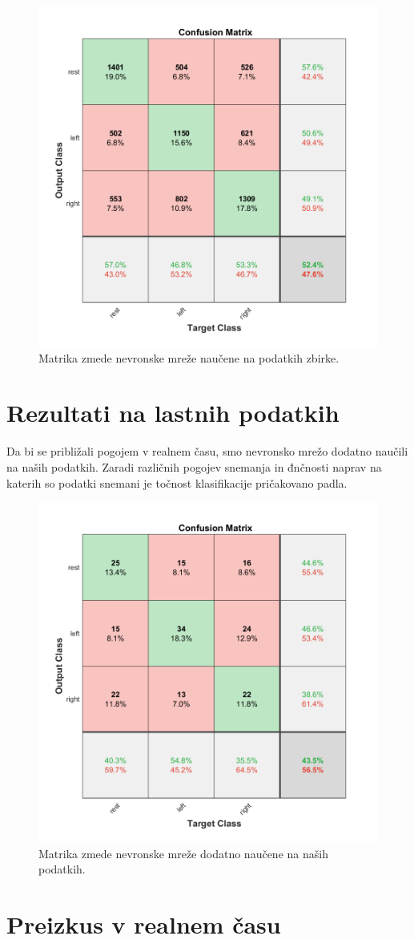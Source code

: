 \begin{figure}[h!]
\begin{center}
\includegraphics[width=0.5\linewidth]{slike/Confusion_13-20Hz_0s-4s.png}
\end{center}
\caption{Matrika zmede nevronske mreže naučene na podatkih zbirke.}
\end{figure}



\section{Rezultati na lastnih podatkih}
Da bi se približali pogojem v realnem času, smo nevronsko mrežo dodatno naučili na naših podatkih. Zaradi različnih pogojev snemanja in đnčnosti naprav na katerih so podatki snemani je točnost klasifikacije pričakovano padla.
\begin{figure}[h!]
\begin{center}
\includegraphics[width=0.5\linewidth]{slike/Confusion_13-20Hz_0s-4s_retrained.png}
\end{center}
\caption{Matrika zmede nevronske mreže dodatno naučene na naših podatkih.}
\end{figure}
\section{Preizkus v realnem času}




